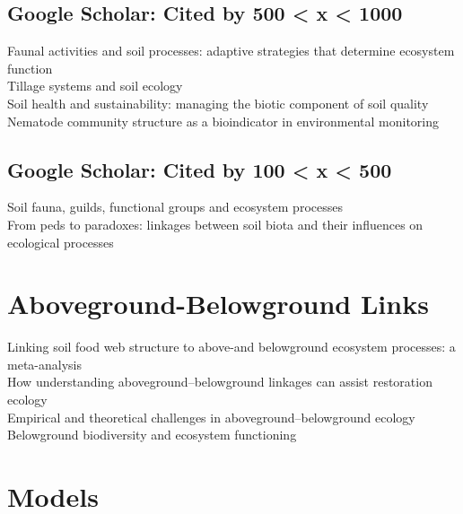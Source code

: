 \documentclass[twoside]{article}	%
\begin{document}
\subsection{Google Scholar: Cited by 500 < x < 1000}
 Faunal activities and soil processes: adaptive strategies that determine ecosystem function\\
 Tillage systems and soil ecology\\
 Soil health and sustainability: managing the biotic component of soil quality\\
 Nematode community structure as a bioindicator in environmental monitoring

\subsection{Google Scholar: Cited by 100 < x < 500}
 Soil fauna, guilds, functional groups and ecosystem processes\\
 From peds to paradoxes: linkages between soil biota and their influences on ecological processes\\


\section{Aboveground-Belowground Links}
 Linking soil food web structure to above-and belowground ecosystem processes: a meta-analysis\\
 How understanding aboveground–belowground linkages can assist restoration ecology\\
 Empirical and theoretical challenges in aboveground–belowground ecology\\
 Belowground biodiversity and ecosystem functioning\\



\section{Models}
\end{document}
